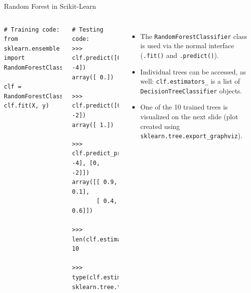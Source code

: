 \documentclass[10pt, aspectratio=169]{beamer} %
\begin{document}
\begin{frame}[fragile,allowframebreaks=0.8]
 {Random Forest in Scikit-Learn}
\begin{columns}[onlytextwidth]
\begin{lstlisting}
# Training code:
from sklearn.ensemble import RandomForestClassifier

clf = RandomForestClassifier()
clf.fit(X, y)
\end{lstlisting}
\begin{lstlisting}
# Testing code:
>>>  clf.predict([0, -4])
array([ 0.])

>>>  clf.predict([0, -2])
array([ 1.])

>>> clf.predict_proba([[0, -4], [0, -2]])
array([[ 0.9,  0.1],
       [ 0.4,  0.6]])

>>> len(clf.estimators_)
10

>>> type(clf.estimators_[0])
sklearn.tree.tree.DecisionTreeClassifier
\end{lstlisting}
\begin{itemize}
\item The \verb+RandomForestClassifier+ class is used via the normal interface (\verb+.fit()+ and \verb+.predict()+).
\item Individual trees can be accessed, as well: \verb+clf.estimators_+ is a list of \verb+DecisionTreeClassifier+
objects.
\item One of the 10 trained trees is visualized on the next slide (plot created using
\verb+sklearn.tree.export_graphviz+).
\end{itemize}
\end{columns}
\end{frame}
\end{document}

